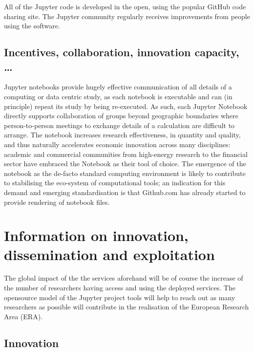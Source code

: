 All of the Jupyter code is developed in the open, using the popular GitHub
code sharing site. The Jupyter community regularly receives improvements from
people using the software.

\subsection{Incentives, collaboration, innovation capacity, \ldots}
Jupyter notebooks provide hugely effective communication of all
details of a computing or data centric study, as each notebook is
executable and can (in principle) repeat its study by being
re-executed. As such, each Jupyter Notebook directly supports
collaboration of groups beyond geographic boundaries where
person-to-person meetings to exchange details of a calculation are
difficult to arrange. The notebook increases research effectiveness,
in quantity and quality, and thus naturally accelerates economic
innovation across many disciplines: academic and commercial
communities from high-energy research to the financial sector have
embraced the Notebook as their tool of choice. The emergence of the
notebook as the de-facto standard computing environment is likely to
contribute to stabilising the eco-system of computational tools; an
indication for this demand and emerging standardisation is that
Github.com has already started to provide rendering of notebook files.




\section{Information on innovation, dissemination and exploitation}

The global impact of the the services aforehand will be of course the increase of the number of researchers having access and using the deployed services. The opensource model of the Jupyter project tools will help to reach out as many researchers as possible will contribute in the realisation of the European Research Area  (ERA).

\subsection{Innovation}

